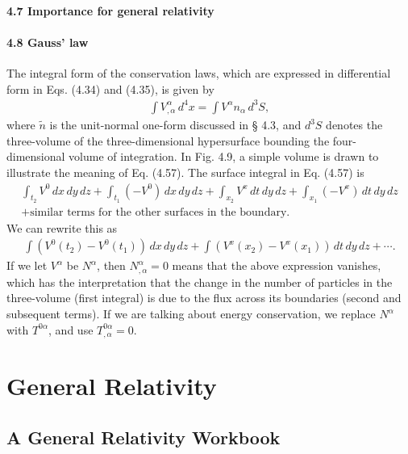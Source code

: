\documentclass[12pt]{book}
\begin{document}
    \subsection{4.7 Importance for general relativity}
    
    \subsection{4.8 Gauss' law}

    The integral form of the conservation laws, which are expressed in differential form in Eqs. (4.34) and (4.35), is given by
    \begin{align}
    \int V^\alpha_{,\alpha} \, d^4x = \int V^\alpha n_\alpha \, d^3 S, \tag{4.57}
    \end{align}
    where \(\tilde{n}\) is the unit-normal one-form discussed in § 4.3, and \(d^3 S\) denotes the three-volume of the three-dimensional hypersurface bounding the four-dimensional volume of integration. In Fig. 4.9, a simple volume is drawn to illustrate the meaning of Eq. (4.57). The surface integral in Eq. (4.57) is
    \begin{align}
    \int_{t_2} V^0 \, dx \, dy \, dz + \int_{t_1} (-V^0) \, dx \, dy \, dz + \int_{x_2} V^x \, dt \, dy \, dz + \int_{x_1} (-V^x) \, dt \, dy \, dz
    \\
    + \text{similar terms for the other surfaces in the boundary}.
    \end{align}
    We can rewrite this as
    \begin{align}
    \int \left( V^0(t_2) - V^0(t_1) \right) \, dx \, dy \, dz + \int \left( V^x(x_2) - V^x(x_1) \right) \, dt \, dy \, dz + \cdots. \tag{4.58}
    \end{align}
    If we let \(V^\alpha\) be \(N^\alpha\), then \(N^\alpha_{,\alpha} = 0\) means that the above expression vanishes, which has the interpretation that the change in the number of particles in the three-volume (first integral) is due to the flux across its boundaries (second and subsequent terms). If we are talking about energy conservation, we replace \(N^\alpha\) with \(T^{0\alpha}\), and use \(T^{0\alpha}_{,\alpha} = 0\).
    
    
\part{General Relativity}



\chapter{A General Relativity Workbook}
\end{document}
